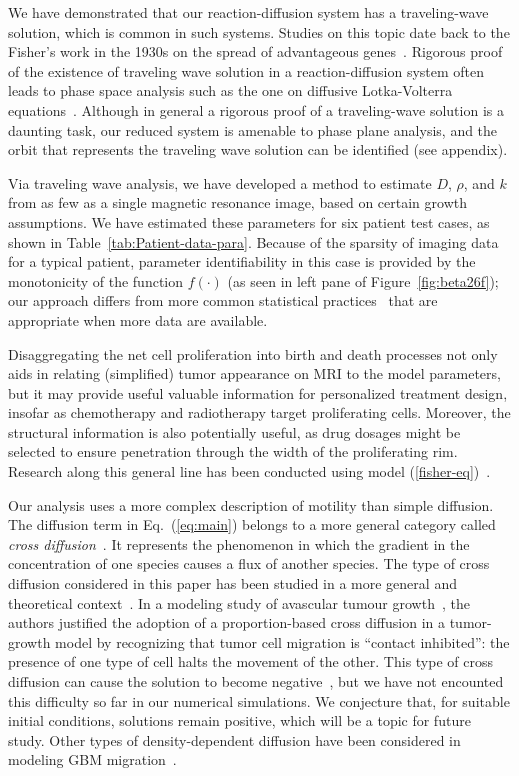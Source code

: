 \documentclass{aims}
\numberwithin{equation}{section}
\begin{document}
We have demonstrated that our reaction-diffusion system has a traveling-wave solution,
which is common in such systems.
Studies on this topic date back to the Fisher's work in the 1930s on the spread of
advantageous genes~\cite{FISHER1937}. Rigorous
proof of the existence of traveling wave solution in a reaction-diffusion
system often leads to phase space analysis such as the one on diffusive
Lotka-Volterra equations~\cite{Dunbar1983}.  Although in general a rigorous
proof of a traveling-wave solution is a daunting task, our reduced system is amenable to phase plane analysis, and the orbit that represents
the traveling wave solution can be identified (see appendix).

Via traveling wave analysis, we have developed a method to estimate $D$, $\rho$, and
$k$ from as few as a single magnetic resonance image, based on certain growth
assumptions. We have estimated these parameters for six
patient test cases, as shown in Table~\ref{tab:Patient-data-para}. Because of the
sparsity of imaging data for a typical patient,
parameter identifiability in this case is provided
by the monotonicity of the function  $f(\cdot)$ (as seen in left pane of
Figure~\ref{fig:beta26f});  our approach differs from more common statistical
practices~\cite{Eisenberg2017} that are appropriate when more data are available. 
   
Disaggregating the net cell proliferation into birth and death processes not only
aids in relating (simplified) tumor appearance on MRI to the model parameters, but
it may provide useful valuable information for personalized treatment
design, insofar as chemotherapy and radiotherapy target proliferating cells.
Moreover, the structural information is also potentially useful, as drug dosages
might be selected to ensure penetration through the width
of the proliferating rim. Research along this general line has been conducted using
model (\ref{fisher-eq})~\cite{Kim2017}.

Our analysis uses a more complex description of motility than simple diffusion.
The diffusion term in Eq.~(\ref{eq:main}) belongs to a more general category called
\emph{cross diffusion}~\cite{Madzvamuse2017}.  It represents the phenomenon in which
the gradient in the concentration of one species causes a flux
of another species.  The type of cross diffusion considered in this paper has been
studied in a more general and theoretical context~\cite{Sherratt2000}.  In a
modeling study of avascular tumour growth~\cite{Sherratt2001b}, the authors justified
the adoption of a proportion-based cross diffusion in a tumor-growth model by recognizing
that tumor cell migration is ``contact inhibited'':  the presence
of one type of cell halts the movement of the other. This type of cross diffusion
can cause the solution to become negative~\cite{Madzvamuse2017}, but we have not
encounted this difficulty so far in our numerical simulations.
We conjecture that, for suitable initial conditions,
solutions remain positive, which will be a topic for future study. 
Other types of density-dependent
diffusion have been considered in modeling GBM migration~\cite{Stepien2015}.
\end{document}
